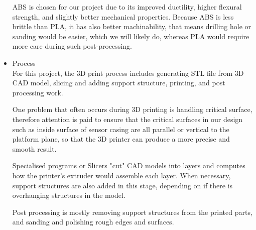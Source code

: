 \begin{itemize}
    ABS is chosen for our project due to its improved ductility, higher flexural strength, and slightly better mechanical properties. Because ABS is less brittle than PLA, it has also better machinability, that means drilling hole or sanding would be easier, which we will likely do, whereas PLA would require more care during such post-processing.

    \item Process\\ 
    For this project, the 3D print process includes generating STL file from 3D CAD model, slicing and adding support structure, printing, and post processing work.

    One problem that often occurs during 3D printing is handling critical surface, therefore attention is paid to ensure that the critical surfaces in our design such as inside surface of sensor casing are all parallel or vertical to the platform plane, so that the 3D printer can produce a more precise and smooth result.

    Specialised programs or Slicers "cut" CAD models into layers and computes how the printer's extruder would assemble each layer. When necessary, support structures are also added in this stage, depending on if there is overhanging structures in the model.

    Post processing is mostly removing support structures from the printed parts, and sanding and polishing rough edges and surfaces.
\end{itemize}

\FloatBarrier
\vspace{1cm}

